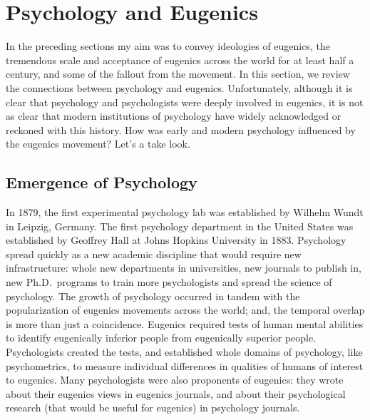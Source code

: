 \documentclass[
  oneside,
  12pt]{crumpbook}
\begin{document}
\hypertarget{psychology-and-eugenics}{%
\section{Psychology and Eugenics}\label{psychology-and-eugenics}}

In the preceding sections my aim was to convey ideologies of eugenics, the tremendous scale and acceptance of eugenics across the world for at least half a century, and some of the fallout from the movement. In this section, we review the connections between psychology and eugenics. Unfortunately, although it is clear that psychology and psychologists were deeply involved in eugenics, it is not as clear that modern institutions of psychology have widely acknowledged or reckoned with this history. How was early and modern psychology influenced by the eugenics movement? Let's a take look.

\hypertarget{emergence-of-psychology}{%
\subsection{Emergence of Psychology}\label{emergence-of-psychology}}

In 1879, the first experimental psychology lab was established by Wilhelm Wundt in Leipzig, Germany. The first psychology department in the United States was established by Geoffrey Hall at Johns Hopkins University in 1883. Psychology spread quickly as a new academic discipline that would require new infrastructure: whole new departments in universities, new journals to publish in, new Ph.D.~programs to train more psychologists and spread the science of psychology. The growth of psychology occurred in tandem with the popularization of eugenics movements across the world; and, the temporal overlap is more than just a coincidence. Eugenics required tests of human mental abilities to identify eugenically inferior people from eugenically superior people. Psychologists created the tests, and established whole domains of psychology, like psychometrics, to measure individual differences in qualities of humans of interest to eugenics. Many psychologists were also proponents of eugenics: they wrote about their eugenics views in eugenics journals, and about their psychological research (that would be useful for eugenics) in psychology journals.
\end{document}
